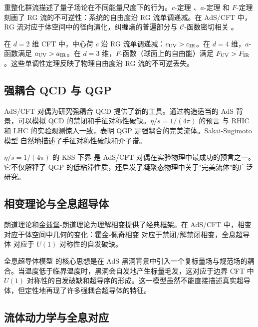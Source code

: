 重整化群流描述了量子场论在不同能量尺度下的行为。$c$-定理 \cite{Zamolodchikov1986}、$a$-定理 \cite{Komargodski2011} 和 $F$-定理 刻画了 RG 流的不可逆性：系统的自由度沿 RG 流单调递减。在 AdS/CFT 中，RG 流对应于体空间中的径向演化，纠缠熵的普遍部分与 $\mathcal{C}$-函数密切相关 \cite{Casini2011}。

\begin{property}[RG 流的单调性]
在 $d=2$ 维 CFT 中，中心荷 $c$ 沿 RG 流单调递减：$c_{\rm UV} > c_{\rm IR}$。在 $d=4$ 维，$a$-函数满足 $a_{\rm UV} > a_{\rm IR}$。在 $d=3$ 维，$F$-函数（球面上的自由能）满足 $F_{\rm UV} > F_{\rm IR}$。这些单调性定理反映了物理自由度沿 RG 流的不可逆丢失。
\end{property}

\subsection{强耦合 QCD 与 QGP}

AdS/CFT 对偶为研究强耦合 QCD 提供了新的工具。通过构造适当的 AdS 背景，可以模拟 QCD 的禁闭和手征对称性破缺。$\eta/s = 1/(4\pi)$ 的预言 \cite{Policastro2001, Kovtun2005} 与 RHIC 和 LHC 的实验观测惊人一致，表明 QGP 是强耦合的完美流体。Sakai-Sugimoto 模型 \cite{Sakai2004} 自然地描述了手征对称性破缺和介子谱。

\begin{remark}
$\eta/s = 1/(4\pi)$ 的 KSS 下界 \cite{Kovtun2005} 是 AdS/CFT 对偶在实验物理中最成功的预言之一。它不仅解释了 QGP 的低粘滞性质，还启发了凝聚态物理中关于"完美流体"的广泛研究。
\end{remark}

\subsection{相变理论与全息超导体}

朗道理论和金兹堡-朗道理论为理解相变提供了经典框架。在 AdS/CFT 中，相变对应于体空间中几何的变化：霍金-佩奇相变 \cite{Hawking1983, Witten1998b} 对应于禁闭/解禁闭相变，全息超导体 \cite{Hartnoll2008} 对应于 $U(1)$ 对称性的自发破缺。

\begin{note}
全息超导体模型 \cite{Hartnoll2008} 的核心思想是在 AdS 黑洞背景中引入一个复标量场与规范场的耦合。当温度低于临界温度时，黑洞会自发地产生标量毛发，这对应于边界 CFT 中 $U(1)$ 对称性的自发破缺和超导序的形成。这一模型虽然不能直接描述真实超导体，但定性地再现了许多强耦合超导体的特征。
\end{note}

\subsection{流体动力学与全息对应}

